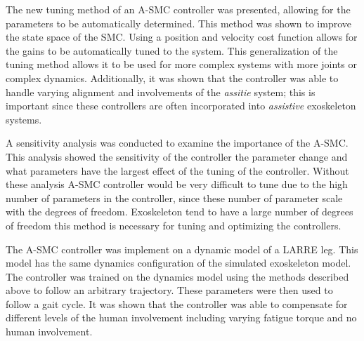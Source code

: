 The new tuning method of an A-SMC controller was presented, allowing for the parameters to be automatically determined. This method was shown to improve the state space of the SMC. Using a position and velocity cost function allows for the gains to be automatically tuned to the system. This generalization of the tuning method allows it to be used for more complex systems with more joints or complex dynamics.  Additionally, it was shown that the controller was able to handle varying alignment and involvements of the \textit{assitie} system; this is important since these controllers are often incorporated into \textit{assistive} exoskeleton systems. 

A sensitivity analysis was conducted to examine the importance of the A-SMC. This analysis showed the sensitivity of the controller the parameter change and what parameters have the largest effect of the tuning of the controller. Without these analysis A-SMC controller would be very difficult to tune due to the high number of parameters in the controller, since these number of parameter scale with the degrees of freedom. Exoskeleton tend to have a large number of degrees of freedom this method is necessary for tuning and optimizing the controllers.   

The A-SMC controller was implement on a dynamic model of a LARRE leg. This model has the same dynamics configuration of the simulated exoskeleton model. The controller was trained on the dynamics model using the methods described above to follow an arbitrary trajectory. These parameters were then used to follow a gait cycle. It was shown that the controller was able to compensate for different levels of the human involvement including varying fatigue torque and no human involvement.   





